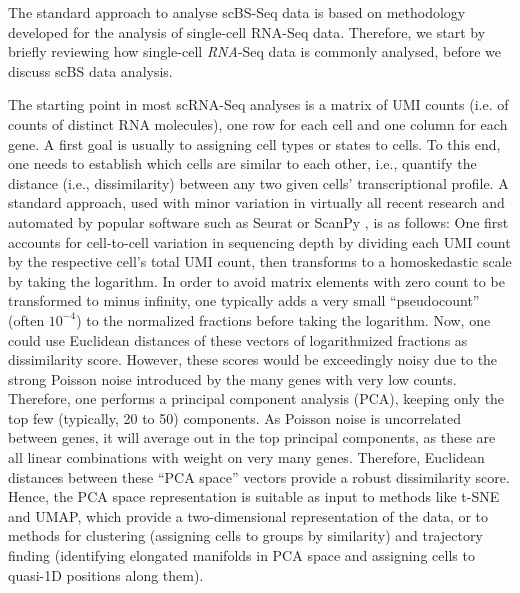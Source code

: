 \documentclass[twocolumn,10pt]{article}
\begin{document}
The standard approach to analyse scBS-Seq data is based on methodology developed for the analysis of single-cell RNA-Seq data. Therefore, we start by briefly reviewing how single-cell \emph{RNA}-Seq data is commonly analysed, before we discuss scBS data analysis.

The starting point in most scRNA-Seq analyses is a matrix of UMI counts (i.e. of counts of distinct RNA molecules), one row for each cell and one column for each gene. A first goal is usually to assigning cell types or states to cells. To this end, one needs to establish which cells are similar to each other, i.e., quantify the distance (i.e., dissimilarity) between any two given cells' transcriptional profile. A standard approach, used with minor variation in virtually all recent research and automated by popular software such as Seurat \citep{Hao_2021} or ScanPy \citep{Wolf_2018}, is as follows: One first accounts for cell-to-cell variation in sequencing depth by dividing each UMI count by the respective cell's total UMI count, then transforms to a homoskedastic scale by taking the logarithm. In order to avoid matrix elements with zero count to be transformed to minus infinity, one typically adds a very small ``pseudocount'' (often $10^{-4}$) to the normalized fractions before taking the logarithm. Now, one could use Euclidean distances of these vectors of logarithmized fractions as dissimilarity score. However, these scores would be exceedingly noisy due to the strong Poisson noise introduced by the many genes with very low counts. Therefore, one performs a principal component analysis (PCA), keeping only the top few (typically, 20 to 50) components. As Poisson noise is uncorrelated between genes, it will average out in the top principal components, as these are all linear combinations with weight on very many genes. Therefore, Euclidean distances between these ``PCA space'' vectors provide a robust dissimilarity score. Hence, the PCA space representation is suitable as input to methods like t-SNE and UMAP, which provide a two-dimensional representation of the data, or to methods for clustering (assigning cells to groups by similarity) and trajectory finding (identifying elongated manifolds in PCA space and assigning cells to quasi-1D positions along them).
\end{document}
